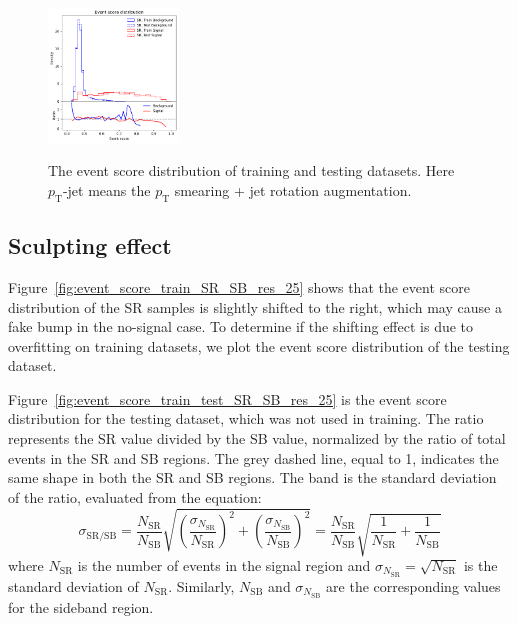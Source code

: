 \documentclass[12pt]{article}
\begin{document}
\begin{figure}[htpb]
{                \includegraphics[width=0.31\textwidth]{HVmodel_event_score_pt_jet_aug_3_train_test_SR_SB_7_res_25.pdf}
            }
            \caption{The event score distribution of training and testing datasets. Here $p_{\text{T}}$-jet means the $p_{\text{T}}$ smearing + jet rotation augmentation.}
            \label{fig:event_score_train_test_SR_res_25}
        \end{figure}
    \subsection{Sculpting effect}%
    \label{sub:sculpting_effect_2}
        Figure~\ref{fig:event_score_train_SR_SB_res_25} shows that the event score distribution of the SR samples is slightly shifted to the right, which may cause a fake bump in the no-signal case. To determine if the shifting effect is due to overfitting on training datasets, we plot the event score distribution of the testing dataset.

        Figure~\ref{fig:event_score_train_test_SR_SB_res_25} is the event score distribution for the testing dataset, which was not used in training. The ratio represents the SR value divided by the SB value, normalized by the ratio of total events in the SR and SB regions. The grey dashed line, equal to 1, indicates the same shape in both the SR and SB regions. The band is the standard deviation of the ratio, evaluated from the equation:
        \begin{equation}\label{eq:distribution_ratio_uncertainty}
            \sigma_{\text{SR/SB}} = \frac{N_{\text{SR}}}{N_{\text{SB}}} \sqrt{\left( \frac{\sigma_{N_{\text{SR}}}}{N_{\text{SR}}} \right)^2 + \left( \frac{\sigma_{N_{\text{SB}}}}{N_{\text{SB}}} \right)^2} = \frac{N_{\text{SR}}}{N_{\text{SB}}} \sqrt{ \frac{1}{N_{\text{SR}}} + \frac{1}{N_{\text{SB}}} }
        \end{equation}
        where $N_{\text{SR}}$ is the number of events in the signal region and $\sigma_{N_{\text{SR}}} = \sqrt{N_{\text{SR}}}$ is the standard deviation of $N_{\text{SR}}$. Similarly, $N_{\text{SB}}$ and $\sigma_{N_{\text{SB}}}$ are the corresponding values for the sideband region.
\end{document}
